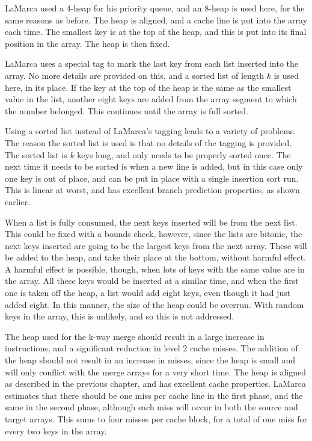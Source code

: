 LaMarca used a 4-heap for his priority queue, and an 8-heap is used here, for
the same reasons as before. The heap is aligned, and a cache line
is put into the array each time. The smallest key is at the top of the heap,
and this is put into its final position in the array. The heap is then fixed.

LaMarca uses a special tag to mark the last key from each list inserted into
the array. No more details are provided on this, and a sorted list of length $k$
is used here, in its place.  If the key at the top of the heap is the same as
the smallest value in the list, another eight keys are added from the array
segment to which the number belonged. This continues until the array is full
sorted.

Using a sorted list instead of LaMarca's tagging leads to a variety of problems.
The reason the sorted list is used is that no details of the tagging is
provided. The sorted list is $k$ keys long, and only needs to be properly sorted
once. The next time it needs to be sorted is when a new line is added, but in
this case only one key is out of place, and can be put in place with a single
insertion sort run. This is linear at worst, and has excellent branch prediction
properties, as shown earlier.

When a list is fully consumed, the next keys inserted will be from the next
list. This could be fixed with a bounds check, however, since the lists are
bitonic, the next keys inserted are going to be the largest keys from the next
array. These will be added to the heap, and take their place at the bottom,
without harmful effect. A harmful effect is possible, though, when lots of keys 
with the same value are in the array. All these keys would be inserted at a
similar time, and when the first one is taken off the heap, a list would add
eight keys, even though it had just added eight. In this manner, the size of the
heap could be overrun. With random keys in the array, this is unlikely, and so
this is not addressed.

The heap used for the k-way merge should result in a large increase in
instructions, and a significant reduction in level 2 cache misses. The addition
of the heap should not result in an increase in misses, since the heap is small
and will only conflict with the merge arrays for a very short time. The heap is
aligned as described in the previous chapter, and has excellent cache
properties. LaMarca estimates that there should be one miss per cache line
in the first phase, and the same in the second phase, although each miss will
occur in both the source and target arrays. This sums to four misses per cache
block, for a total of one miss for every two keys in the array.

